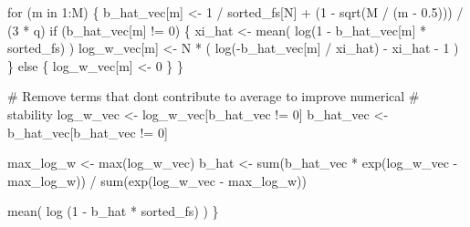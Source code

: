 \documentclass[
  letterpaper,
  DIV=11,
  numbers=noendperiod]{scrartcl}
\newenvironment{Shaded}{\begin{snugshade}}{\end{snugshade}}
\newcommand{\BuiltInTok}[1]{\textcolor[rgb]{0.00,0.23,0.31}{#1}}
\newcommand{\CommentTok}[1]{\textcolor[rgb]{0.37,0.37,0.37}{#1}}
\newcommand{\ControlFlowTok}[1]{\textcolor[rgb]{0.00,0.23,0.31}{#1}}
\newcommand{\DecValTok}[1]{\textcolor[rgb]{0.68,0.00,0.00}{#1}}
\newcommand{\FloatTok}[1]{\textcolor[rgb]{0.68,0.00,0.00}{#1}}
\newcommand{\KeywordTok}[1]{\textcolor[rgb]{0.00,0.23,0.31}{#1}}
\newcommand{\NormalTok}[1]{\textcolor[rgb]{0.00,0.23,0.31}{#1}}
\newcommand{\OperatorTok}[1]{\textcolor[rgb]{0.37,0.37,0.37}{#1}}
\begin{document}
\begin{Shaded}
\begin{Highlighting}[]
  \ControlFlowTok{for}\NormalTok{ (m }\KeywordTok{in} \DecValTok{1}\NormalTok{:M) \{}
\NormalTok{    b\_hat\_vec[m] }\OperatorTok{\textless{}{-}} \DecValTok{1} \OperatorTok{/}\NormalTok{ sorted\_fs[N] }\OperatorTok{+} 
\NormalTok{                 (}\DecValTok{1} \OperatorTok{{-}}\NormalTok{ sqrt(M }\OperatorTok{/}\NormalTok{ (m }\OperatorTok{{-}} \FloatTok{0.5}\NormalTok{))) }\OperatorTok{/}\NormalTok{ (}\DecValTok{3} \OperatorTok{*}\NormalTok{ q)}
    \ControlFlowTok{if}\NormalTok{ (b\_hat\_vec[m] }\OperatorTok{!=} \DecValTok{0}\NormalTok{) \{}
\NormalTok{      xi\_hat }\OperatorTok{\textless{}{-}}\NormalTok{ mean( log(}\DecValTok{1} \OperatorTok{{-}}\NormalTok{ b\_hat\_vec[m] }\OperatorTok{*}\NormalTok{ sorted\_fs) )}
\NormalTok{      log\_w\_vec[m] }\OperatorTok{\textless{}{-}}\NormalTok{ N }\OperatorTok{*}\NormalTok{ ( log(}\OperatorTok{{-}}\NormalTok{b\_hat\_vec[m] }\OperatorTok{/}\NormalTok{ xi\_hat) }\OperatorTok{{-}}\NormalTok{ xi\_hat }\OperatorTok{{-}} \DecValTok{1}\NormalTok{ )}
\NormalTok{    \} }\ControlFlowTok{else}\NormalTok{ \{}
\NormalTok{      log\_w\_vec[m] }\OperatorTok{\textless{}{-}} \DecValTok{0}
\NormalTok{    \}}
\NormalTok{  \}}
  
  \CommentTok{\# Remove terms that don\textquotesingle{}t contribute to average to improve numerical }
  \CommentTok{\# stability}
\NormalTok{  log\_w\_vec }\OperatorTok{\textless{}{-}}\NormalTok{ log\_w\_vec[b\_hat\_vec }\OperatorTok{!=} \DecValTok{0}\NormalTok{]}
\NormalTok{  b\_hat\_vec }\OperatorTok{\textless{}{-}}\NormalTok{ b\_hat\_vec[b\_hat\_vec }\OperatorTok{!=} \DecValTok{0}\NormalTok{]}

\NormalTok{  max\_log\_w }\OperatorTok{\textless{}{-}} \BuiltInTok{max}\NormalTok{(log\_w\_vec)}
\NormalTok{  b\_hat }\OperatorTok{\textless{}{-}} \BuiltInTok{sum}\NormalTok{(b\_hat\_vec }\OperatorTok{*}\NormalTok{ exp(log\_w\_vec }\OperatorTok{{-}}\NormalTok{ max\_log\_w)) }\OperatorTok{/}
           \BuiltInTok{sum}\NormalTok{(exp(log\_w\_vec }\OperatorTok{{-}}\NormalTok{ max\_log\_w))}

\NormalTok{  mean( log (}\DecValTok{1} \OperatorTok{{-}}\NormalTok{ b\_hat }\OperatorTok{*}\NormalTok{ sorted\_fs) )}
\NormalTok{\}}
\end{Highlighting}
\end{Shaded}
\end{document}
